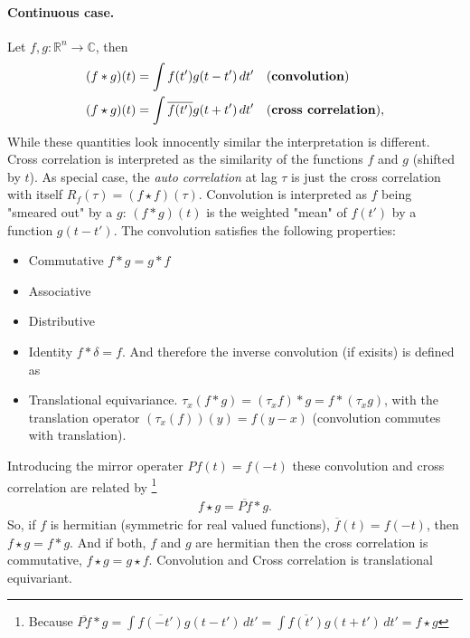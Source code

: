 \documentclass[12pt,a4paper]{article}
\begin{document}
\paragraph{Continuous case. }
Let $f, g: \mathbb R ^n \rightarrow \mathbb C$, then 
\begin{align}
	(f * g)(t) &= \int f(t') g(t - t') \, dt'  \quad \text{(\textbf{convolution})}\\
	(f \star g)(t) &= \int \overline {f(t')} g(t + t') \, dt' \quad \text{(\textbf{cross correlation})},
\end{align}
While these quantities look innocently similar the interpretation is different. Cross correlation is interpreted as the similarity of the functions $f$ and $g$ (shifted by $t$). As special case, the \textit{auto correlation} at lag $\tau$ is just the cross correlation with itself $R_f(\tau) = (f \star f)(\tau)$.  Convolution is interpreted as $f$ being  "smeared out" by a  $g$: $(f*g)(t)$ is the weighted "mean" of $f(t')$ by a function $g(t-t')$. The convolution satisfies the following properties:
\begin{itemize}
	\item Commutative $f*g = g* f$
	\item Associative 
	\item Distributive
	\item Identity $f * \delta = f$. And therefore the inverse convolution (if exisits) is defined as 
	\item Translational equivariance. $\tau_x(f*g) = (\tau_x f) * g =   f *  (\tau_x g)$, with the translation operator $(\tau_x(f))(y) = f(y-x)$ (convolution commutes with translation).
	
\end{itemize}

Introducing the mirror operater $Pf(t) = f(-t)$ these convolution and cross correlation are related by \footnote{Because $\overline{Pf} * g = \int \overline{f(-t')} g(t - t') \, dt' = \int \overline{f(t')} g(t + t') \, dt' = f \star g $}
\begin{align} \label{eq:relation_conv_corr_cont}
f \star g = \overline{Pf} * g.
\end{align}
So, if $f$ is hermitian (symmetric for real valued functions), $\overline {f}(t) = f(-t)$, then $f \star g = f * g$. And if both, $f$ and  $g$ are hermitian then the cross correlation is commutative, $f\star g = g \star f$. Convolution and Cross correlation is translational equivariant.
\end{document}

